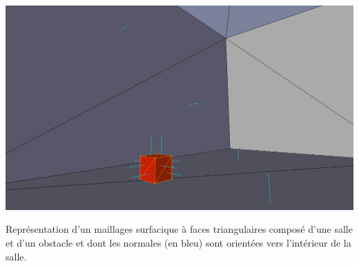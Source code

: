 \begin{figureth}
	\includegraphics[width=0.8\linewidth]{images/normales}
	\caption{Représentation d'un maillages surfacique à faces triangulaires composé d'une salle et d'un obstacle et dont les normales (en bleu) sont orientées vers l'intérieur de la salle.}
	\label{normales}
\end{figureth}

